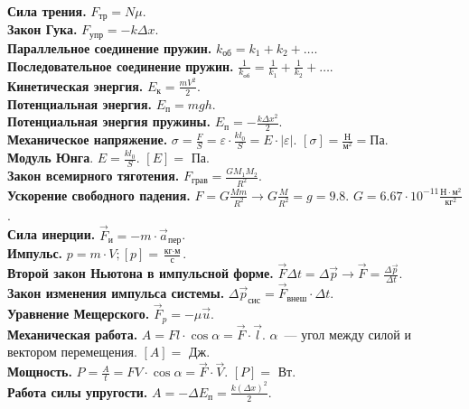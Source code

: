 \documentclass[12pt]{article}
\begin{document}
	\textbf{Сила трения.} $F_{\text{тр}} = N \mu$.\\
	\textbf{Закон Гука.} $F_{\text{упр}} = -k \varDelta x$.\\
	\textbf{Параллельное соединение пружин.} $k_{\text{об}} = k_1 + k_2 + \dots$.\\
	\textbf{Последовательное соединение пружин.} $\frac{1}{k_{\text{об}}} = \frac{1}{k_1} + \frac{1}{k_2} + \dots$.\\
	\textbf{Кинетическая энергия.} $E_{\text{к}} = \frac{mV^2}{2}$.\\
	\textbf{Потенциальная энергия.} $E_{\text{п}} = mgh$.\\
	\textbf{Потенциальная энергия пружины.} $E_{\text{п}} = -\frac{k \varDelta x^2}{2}$.\\
	\textbf{Механическое напряжение.} $\sigma = \frac{F}{S} = \varepsilon \cdot \frac{kl_0}{S} = E \cdot |\varepsilon|$. $[\sigma] = \frac{\text{Н}}{\text{м}^2} = \text{Па}$.\\
	\textbf{Модуль Юнга}. $E = \frac{kl_0}{S}$. $[E] =$ Па.\\
	\textbf{Закон всемирного тяготения.} $F_{\text{грав}} = \frac{GM_1M_2}{R^2}$.\\
	\textbf{Ускорение свободного падения.} $F = G \frac{Mm}{R^2} \rightarrow G \frac{M}{R^2} = g = 9.8$. $G = 6.67 \cdot 10^{-11} \frac{\text{Н} \cdot \text{м}^2}{\text{кг}^2}$.\\
	\textbf{Сила инерции.} $\vec{F}_{\text{и}} = -m \cdot \vec{a}_{\text{пер}}$.\\
	\textbf{Импульс.} $p = m \cdot V; [p] = \frac{\text{кг} \cdot \text{м}}{\text{с}}$.\\
	\textbf{Второй закон Ньютона в импульсной форме.} $\vec{F} \varDelta t = \varDelta \vec{p} \rightarrow \vec{F} = \frac{\varDelta \vec{p}}{\varDelta t}$.\\
	\textbf{Закон изменения импульса системы.} $\varDelta \vec{p}_{\text{сис}} = \vec{F}_{\text{внеш}} \cdot \varDelta t$.\\
	\textbf{Уравнение Мещерского.} $\vec{F}_{p} = -\mu \vec{u}$.\\
	\textbf{Механическая работа.} $A = Fl \cdot \cos \alpha = \vec{F} \cdot \vec{l}$. $\alpha$~--- угол между силой и вектором перемещения. $[A] =$ Дж.\\
	\textbf{Мощность.} $P = \frac{A}{t} = FV \cdot \cos \alpha = \vec{F} \cdot \vec{V}$. $[P] =$ Вт.\\
	\textbf{Работа силы упругости.} $A = -\varDelta E_{\text{п}} = \frac{k (\varDelta x)^2}{2}$.\\
\end{document}
